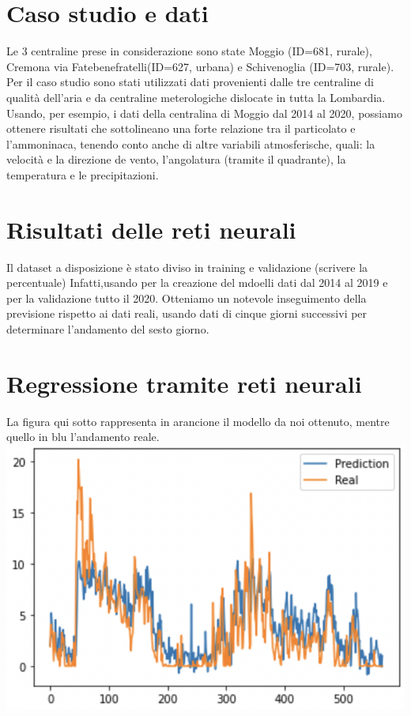 \documentclass{article}
\begin{document}
\section{Caso studio e dati}

Le 3 centraline prese in considerazione sono state Moggio (ID=681, rurale), Cremona via Fatebenefratelli(ID=627, urbana)
e Schivenoglia (ID=703, rurale).
Per il caso studio sono stati utilizzati dati provenienti dalle 
tre centraline di qualità dell'aria e da centraline meterologiche dislocate in tutta la Lombardia.
\\Usando, per esempio, i dati della centralina di Moggio dal 2014 al 2020, possiamo ottenere risultati 
che sottolineano una forte relazione tra il particolato e l'ammoninaca, tenendo conto anche di altre variabili
atmosferische, quali: la velocità e la direzione de vento, l'angolatura (tramite il quadrante), la temperatura e le precipitazioni.
\section{Risultati delle reti neurali}
Il dataset a disposizione è stato diviso in training e validazione (scrivere la percentuale)
Infatti,usando per la creazione del mdoelli dati dal 2014 al 2019 e per la 
validazione tutto il 2020. Otteniamo un notevole inseguimento della previsione rispetto ai dati reali, 
usando dati di cinque giorni successivi per determinare l'andamento del sesto giorno.
\section{Regressione tramite reti neurali}
La figura qui sotto rappresenta in arancione il modello da noi ottenuto, 
mentre quello in blu l'andamento reale.
    \includegraphics[scale = 0.5]{Immagini/Regressione1.PNG}
\end{document}

